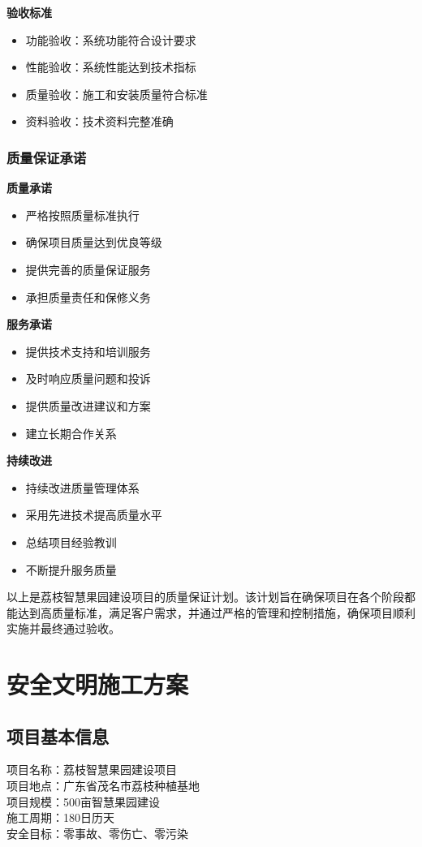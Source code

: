 \documentclass[UTF8,a4paper,zihao=-4]{ctexart}
\begin{document}
\textbf{验收标准}
\begin{itemize}
    \item 功能验收：系统功能符合设计要求
    \item 性能验收：系统性能达到技术指标
    \item 质量验收：施工和安装质量符合标准
    \item 资料验收：技术资料完整准确
\end{itemize}

\subsubsection{质量保证承诺}
\textbf{质量承诺}
\begin{itemize}
    \item 严格按照质量标准执行
    \item 确保项目质量达到优良等级
    \item 提供完善的质量保证服务
    \item 承担质量责任和保修义务
\end{itemize}

\textbf{服务承诺}
\begin{itemize}
    \item 提供技术支持和培训服务
    \item 及时响应质量问题和投诉
    \item 提供质量改进建议和方案
    \item 建立长期合作关系
\end{itemize}

\textbf{持续改进}
\begin{itemize}
    \item 持续改进质量管理体系
    \item 采用先进技术提高质量水平
    \item 总结项目经验教训
    \item 不断提升服务质量
\end{itemize}

以上是荔枝智慧果园建设项目的质量保证计划。该计划旨在确保项目在各个阶段都能达到高质量标准，满足客户需求，并通过严格的管理和控制措施，确保项目顺利实施并最终通过验收。

\section{安全文明施工方案}

\subsection{项目基本信息}
项目名称：荔枝智慧果园建设项目 \\
项目地点：广东省茂名市荔枝种植基地 \\
项目规模：500亩智慧果园建设 \\
施工周期：180日历天 \\
安全目标：零事故、零伤亡、零污染
\end{document}
